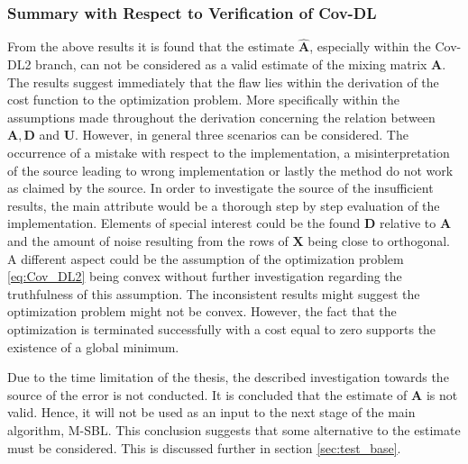 \subsubsection{Summary with Respect to Verification of Cov-DL}
From the above results it is found that the estimate $\hat{\mathbf{A}}$, especially within the Cov-DL2 branch, can not be considered as a valid estimate of the mixing matrix $\mathbf{A}$. 
The results suggest immediately that the flaw lies within the derivation of the cost function to the optimization problem. More specifically within the assumptions made throughout the derivation concerning the relation between $\mathbf{A}, \mathbf{D}$ and $\mathbf{U}$. 
However, in general three scenarios can be considered. 
The occurrence of a mistake with respect to the implementation, a misinterpretation of the source \cite{Balkan2015} leading to wrong implementation or lastly the method do not work as claimed by the source. 
In order to investigate the source of the insufficient results, the main attribute would be a thorough step by step evaluation of the implementation. 
Elements of special interest could be the found $\mathbf{D}$ relative to $\mathbf{A}$ and the amount of noise resulting from the rows of $\mathbf{X}$ being close to orthogonal. 
A different aspect could be the assumption of the optimization problem \eqref{eq:Cov_DL2} being convex without further investigation regarding the truthfulness of this assumption. 
The inconsistent results might suggest the optimization problem might not be convex. 
However, the fact that the optimization is terminated successfully with a cost equal to zero supports the existence of a global minimum.

Due to the time limitation of the thesis, the described investigation towards the source of the error is not conducted. 
It is concluded that the estimate of $\mathbf{A}$ is not valid.
Hence, it will not be used as an input to the next stage of the main algorithm, M-SBL. 
This conclusion suggests that some alternative to the estimate must be considered. 
This is discussed further in section \ref{sec:test_base}.

